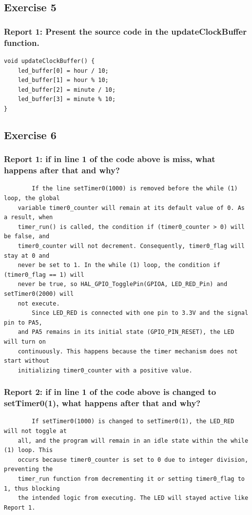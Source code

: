 \documentclass[a4paper,12pt]{article}
\begin{document}
\subsection{Exercise 5}
\subsubsection{Report 1: Present the source code in the updateClockBuffer function.}
\begin{lstlisting}
void updateClockBuffer() {
	led_buffer[0] = hour / 10;
	led_buffer[1] = hour % 10;
	led_buffer[2] = minute / 10;
	led_buffer[3] = minute % 10;
}
\end{lstlisting}
\newpage
\subsection{Exercise 6}
\subsubsection{Report 1: if in line 1 of the code above is miss, what happens after that and why?}
\begin{verbatim}
	    If the line setTimer0(1000) is removed before the while (1) loop, the global 
	variable timer0_counter will remain at its default value of 0. As a result, when 
	timer_run() is called, the condition if (timer0_counter > 0) will be false, and 
	timer0_counter will not decrement. Consequently, timer0_flag will stay at 0 and 
	never be set to 1. In the while (1) loop, the condition if (timer0_flag == 1) will 
	never be true, so HAL_GPIO_TogglePin(GPIOA, LED_RED_Pin) and setTimer0(2000) will 
	not execute. 
	    Since LED_RED is connected with one pin to 3.3V and the signal pin to PA5,
	and PA5 remains in its initial state (GPIO_PIN_RESET), the LED will turn on 
	continuously. This happens because the timer mechanism does not start without 
	initializing timer0_counter with a positive value.
\end{verbatim}
\subsubsection{Report 2: if in line 1 of the code above is changed to setTimer0(1), what happens after
	that and why?}
\begin{verbatim}
	    If setTimer0(1000) is changed to setTimer0(1), the LED_RED will not toggle at 
	all, and the program will remain in an idle state within the while (1) loop. This 
	occurs because timer0_counter is set to 0 due to integer division, preventing the 
	timer_run function from decrementing it or setting timer0_flag to 1, thus blocking 
	the intended logic from executing. The LED will stayed active like Report 1.
\end{verbatim}
\end{document}
